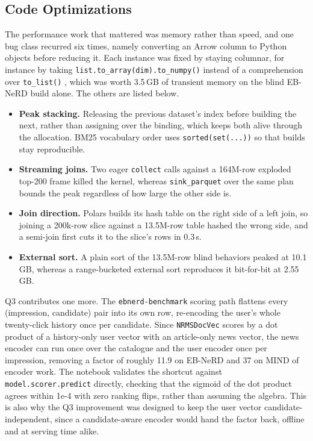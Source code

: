 \documentclass[11pt]{article}
\newcommand{\code}[1]{%
    \colorbox{gray!40}{\texttt{#1}}%
}
\begin{document}
\subsection{Code Optimizations}
\label{sec:optimizations}

The performance work that mattered was memory rather than speed, and one bug
class recurred six times, namely converting an Arrow column to Python objects
before reducing it. Each instance was fixed by staying columnar, for instance
by taking \code{list.to\_array(dim).to\_numpy()} instead of a comprehension
over \code{to\_list()}, which was worth 3.5\,GB of transient memory on the
blind EB-NeRD build alone. The others are listed below.

\begin{itemize}\itemsep2pt
\item \textbf{Peak stacking.} Releasing the previous dataset's index before
building the next, rather than assigning over the binding, which keeps both
alive through the allocation. BM25 vocabulary order uses
\code{sorted(set(...))} so that builds stay reproducible.
\item \textbf{Streaming joins.} Two eager \code{collect} calls against a
164M-row exploded top-200 frame killed the kernel, whereas
\code{sink\_parquet} over the same plan bounds the peak regardless of how
large the other side is.
\item \textbf{Join direction.} Polars builds its hash table on the right side
of a left join, so joining a 200k-row slice against a 13.5M-row table hashed
the wrong side, and a semi-join first cuts it to the slice's rows in 0.3\,s.
\item \textbf{External sort.} A plain sort of the 13.5M-row blind behaviors
peaked at 10.1\,GB, whereas a range-bucketed external sort reproduces it
bit-for-bit at 2.55\,GB.
\end{itemize}

Q3 contributes one more. The \code{ebnerd-benchmark} scoring path flattens
every (impression, candidate) pair into its own row, re-encoding the user's
whole twenty-click history once per candidate. Since \code{NRMSDocVec} scores
by a dot product of a history-only user vector with an article-only news
vector, the news encoder can run once over the catalogue and the user encoder
once per impression, removing a factor of roughly 11.9 on EB-NeRD and 37 on
MIND of encoder work. The notebook validates the shortcut against
\code{model.scorer.predict} directly, checking that the sigmoid of the dot
product agrees within 1e-4 with zero ranking flips, rather than assuming the
algebra. This is also why the Q3 improvement was designed to keep the user
vector candidate-independent, since a candidate-aware encoder would hand the
factor back, offline and at serving time alike.
\end{document}
